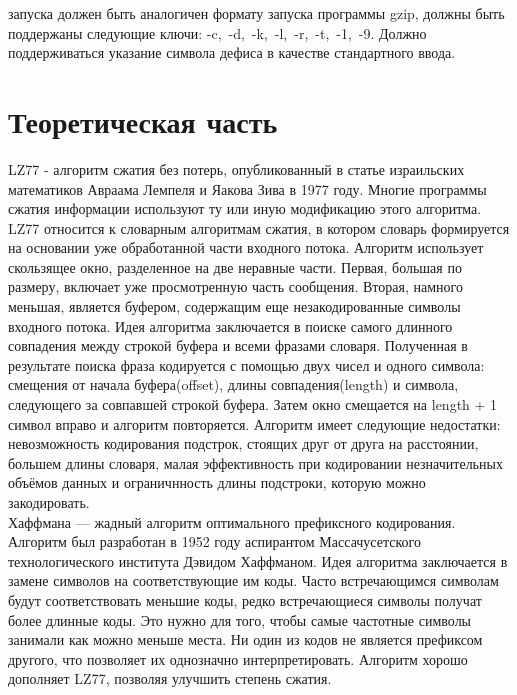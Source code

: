 \documentclass[14pt]{article}
\begin{document}
 запуска должен быть аналогичен формату запуска программы gzip, должны быть поддержаны следующие ключи:  \mbox{-c, -d, -k, -l, -r, -t, -1, -9}. Должно поддерживаться указание символа дефиса в качестве стандартного ввода.

\pagebreak

\section*{Теоретическая часть}

LZ77 -  алгоритм сжатия без потерь, опубликованный в статье израильских математиков Авраама Лемпеля и Яакова Зива в 1977 году. Многие программы сжатия информации используют ту или иную модификацию этого алгоритма. LZ77 относится к словарным алгоритмам сжатия, в котором словарь формируется на основании уже обработанной части входного потока. Алгоритм использует скользящее окно, разделенное на две неравные части. Первая, большая по размеру, включает уже просмотренную часть сообщения. Вторая, намного меньшая, является буфером, содержащим еще незакодированные символы входного потока. Идея алгоритма заключается в поиске самого длинного совпадения между строкой буфера и всеми фразами словаря. Полученная в результате поиска фраза кодируется с помощью двух чисел и одного символа: смещения от начала буфера(offset), длины совпадения(length) и символа, следующего за совпавшей строкой буфера. Затем окно смещается на length + 1 символ вправо и алгоритм повторяется. Алгоритм имеет следующие недостатки: невозможность кодирования подстрок, стоящих друг от друга на расстоянии, большем длины словаря, малая эффективность при кодировании незначительных объёмов данных и ограничнность длины подстроки, которую можно закодировать. \\

 Хаффмана — жадный алгоритм оптимального префиксного кодирования. Алгоритм был разработан в 1952 году аспирантом Массачусетского технологического института Дэвидом Хаффманом. Идея алгоритма заключается в замене символов на соответствующие им коды. Часто встречающимся символам будут соответствовать меньшие коды, редко встречающиеся символы получат более длинные коды. Это нужно для того, чтобы самые частотные символы занимали как можно меньше места. Ни один из кодов не является префиксом другого, что позволяет их однозначно интерпретировать. Алгоритм хорошо дополняет LZ77, позволяя улучшить степень сжатия.
\pagebreak
\end{document}
